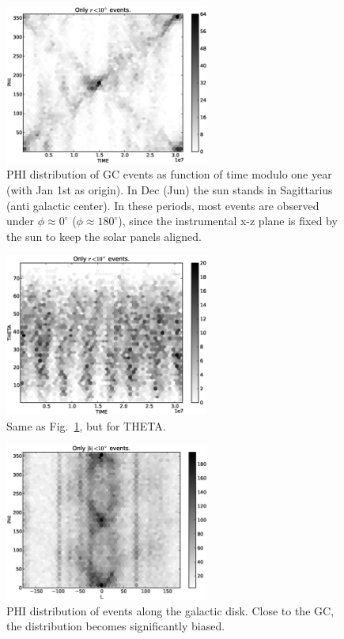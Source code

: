 \documentclass[aps,twocolumn,prd,superscriptaddress,showpacs,nofootinbib,fixfloat]{revtex4}
\begin{document}
\begin{figure}
\centering
\includegraphics[width=0.6\textwidth]{plots/TIME_PHI.eps}
\caption{PHI distribution of GC events as function of time modulo one year
(with Jan 1st as origin). In Dec (Jun) the sun stands in Sagittarius (anti
galactic center). In these periods, most events are observed under
$\phi\approx 0^\circ$ ($\phi\approx 180^\circ$), since the instrumental x-z
plane is fixed by the sun to keep the solar panels aligned.}
\label{fig:time_phi}
\end{figure}

\begin{figure}
\centering
\includegraphics[width=0.6\textwidth]{plots/TIME_THETA.eps}
\caption{Same as Fig.~\ref{fig:time_phi}, but for THETA.}
\label{fig:time_theta}
\end{figure}

\begin{figure}
\centering
\includegraphics[width=0.6\textwidth]{plots/L_PHI.eps}
\caption{PHI distribution of events along the galactic disk. Close to the GC, the
distribution becomes significantly biased.}
\label{fig:l_phi}
\end{figure}
\end{document}
